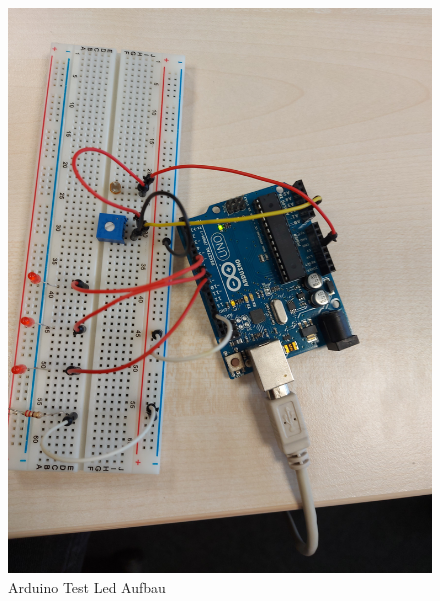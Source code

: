 \begin{figure}[h]
\begin{center}
\includegraphics[width=15cm]{img/esp32testled.jpg}
\caption{Arduino Test Led Aufbau}
\label{esp32testled}
\end{center}
\end{figure}

